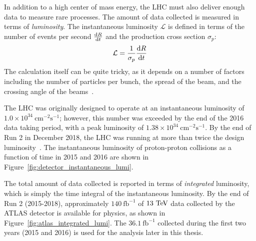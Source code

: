 In addition to a high center of mass energy, the LHC must also deliver enough data to measure rare processes.
The amount of data collected is measured in terms of \emph{luminosity}.
The instantaneous luminosity $\mathcal{L}$ is defined in terms of the number of events per second $\frac{\textrm{d}R}{\textrm{d}t}$ and the production cross section $\sigma_p$:
\begin{equation}
  \mathcal{L} = \frac{1}{\sigma_p}\deriv{R}{t}
  \label{eq:inst_lumi}
\end{equation}
The calculation itself can be quite tricky, as it depends on a number of factors including the number of particles per bunch, the spread of the beam, and the crossing angle of the beams~\cite{2006.lumi}.

The LHC was originally designed to operate at an instantaneous luminosity of $1.0\times 10^{34}~\textrm{cm}^{-2}\textrm{s}^{-1}$; however, this number was exceeded by the end of the 2016 data taking period, with a peak luminosity of $1.38\times 10^{34}~\textrm{cm}^{-2}\textrm{s}^{-1}$.
By the end of Run 2 in December 2018, the LHC was running at more than twice the design luminosity~\cite{2019.atlas-lumi-plots}.
The instantaneous luminosity of proton-proton collisions as a function of time in 2015 and 2016 are shown in Figure~\ref{fig:detector_instantaneous_lumi}.

The total amount of data collected is reported in terms of \emph{integrated} luminosity, which is simply the time integral of the instantaneous luminosity.
By the end of Run 2 (2015-2018), approximately $140~\textrm{fb}^{-1}$ of $13\tev$ data collected by the ATLAS detector is available for physics, as shown in Figure~\ref{fig:atlas_integrated_lumi}.
The $36.1~\textrm{fb}^{-1}$ collected during the first two years (2015 and 2016) is used for the analysis later in this thesis.

